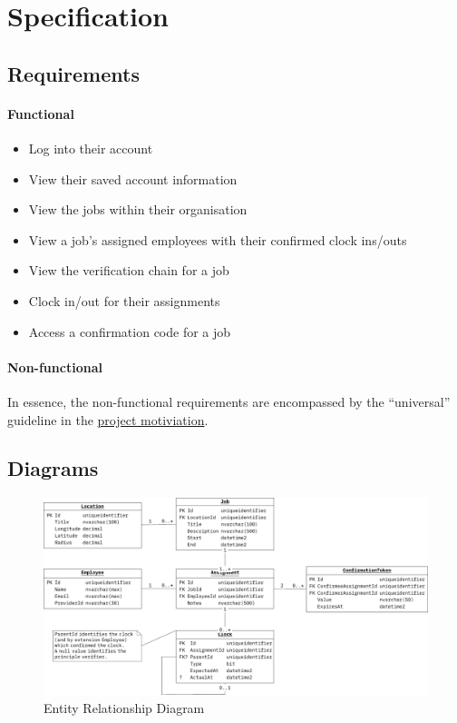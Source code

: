 \section{Specification}

\subsection{Requirements} \label{ss:requirements}

\paragraph{Functional}

\begin{itemize}
  \item Log into their account
  \item View their saved account information
  \item View the jobs within their organisation
  \item View a job's assigned employees with their
        confirmed clock ins/outs
  \item View the verification chain for a job
  \item Clock in/out for their assignments
  \item Access a confirmation code for a job
\end{itemize}

\paragraph{Non-functional}

In essence, the non-functional requirements are encompassed
by the \enquote{universal} guideline in the
\hyperref[s:motivation]{project motiviation}.

\subsection{Diagrams}


\begin{figure}[H]
  \centering
  \includegraphics[width=\linewidth]
  {05 design/assets/entity relationship diagram.pdf}
  \caption{Entity Relationship Diagram}
  \label{fig:erd}
\end{figure}

